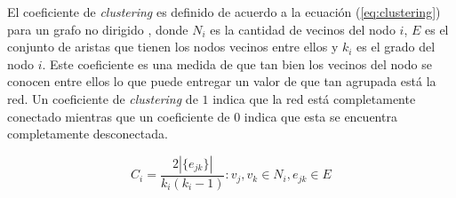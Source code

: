 El coeficiente de \textit{clustering} es definido de acuerdo a la ecuación
(\ref{eq:clustering}) para un grafo no dirigido \cite{Watts1998}, donde $N_i$ es
la cantidad de vecinos del nodo $i$, $E$ es el conjunto de aristas que tienen
los nodos vecinos entre ellos y $k_i$ es el grado del nodo $i$. Este coeficiente
es una medida de que tan bien los vecinos del nodo se conocen entre ellos lo que
puede entregar un valor de que tan agrupada está la red. Un coeficiente de
\textit{clustering} de $1$ indica que la red está completamente conectado
mientras que un coeficiente de $0$ indica que esta se encuentra completamente
desconectada.

\begin{equation}
  C_i = \frac{2|\{e_{jk}\}|}{k_i(k_i - 1)} : v_j,v_k \in N_i, e_{jk} \in E
  \label{eq:clustering}
\end{equation}



